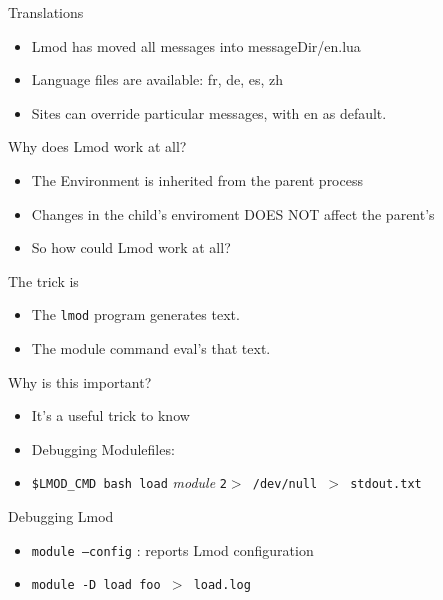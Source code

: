 \documentclass{beamer}
\begin{document}
\begin{frame}{Translations}
  \begin{itemize}
    \item Lmod has moved all messages into messageDir/en.lua
    \item Language files are available: fr, de, es, zh
    \item Sites can override particular messages, with en as default.
  \end{itemize}
\end{frame}


\begin{frame}{Why does Lmod work at all?}
  \begin{itemize}
    \item The Environment is inherited from the parent process
    \item Changes in the child's enviroment DOES NOT affect the
      parent's
    \item So how could Lmod work at all? 
  \end{itemize}
\end{frame}

\begin{frame}{The trick is}
  \begin{itemize}
    \item The \texttt{lmod} program generates text.
    \item The module command eval's that text.
  \end{itemize}
\end{frame}

\begin{frame}{Why is this important?}
  \begin{itemize}
    \item It's a useful trick to know
    \item Debugging Modulefiles:
    \item \texttt{\$LMOD\_CMD bash load} \emph{module} \texttt{2$>$
        /dev/null $>$ stdout.txt}
  \end{itemize}
\end{frame}

\begin{frame}{Debugging Lmod}
  \begin{itemize}
    \item \texttt{module --config} : reports Lmod configuration
    \item \texttt{module -D load foo $>$ load.log}
  \end{itemize}
\end{frame}
\end{document}
